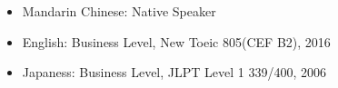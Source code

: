 \documentclass[a4paper,12pt]{memoir} %
\begin{document}
\Sep %
\Sep %
\Sep %

\begin{itemize}
  \item Mandarin Chinese: Native Speaker
  \item English: Business Level, New Toeic 805(CEF B2), 2016
  \item Japaness: Business Level, JLPT Level 1 339/400, 2006
\end{itemize}


\Sep %
\Sep %
\Sep %
\end{document}
